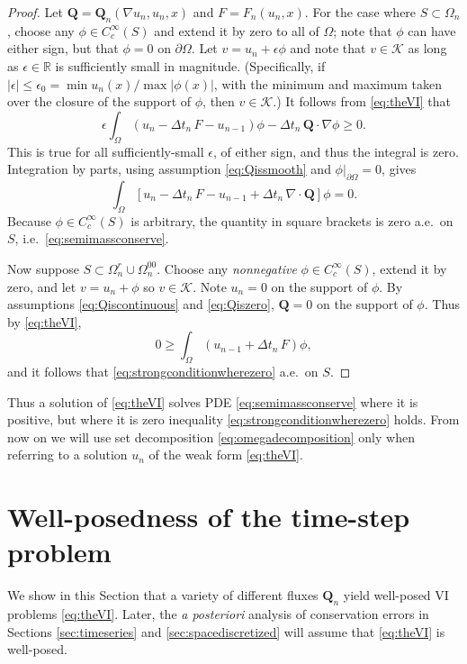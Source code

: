 \documentclass[final,onefignum]{siamart190516}
\newcommand\bQ{\mathbf{Q}}
\newcommand{\Div}{\nabla\cdot}
\newcommand\eps{\epsilon}
\newcommand{\grad}{\nabla}
\newcommand\RR{\mathbb{R}}
\begin{document}
\begin{proof}  Let $\bQ = \bQ_n(\grad u_n,u_n,x)$ and $F=F_n(u_n,x)$.  For the case where $S \subset \Omega_n$, choose any $\phi\in C_c^\infty(S)$ and extend it by zero to all of $\Omega$; note that $\phi$ can have either sign, but that $\phi=0$ on $\partial\Omega$.  Let $v = u_n + \eps \phi$ and note that $v \in \mathcal{K}$ as long as $\eps\in\RR$ is sufficiently small in magnitude.  (Specifically, if $|\eps|\le \eps_0 = \min u_n(x) / \max |\phi(x)|$, with the minimum and maximum taken over the closure of the support of $\phi$, then $v \in \mathcal{K}$.)  It follows from \eqref{eq:theVI} that
   $$\eps \int_\Omega \left(u_n - \Delta t_n\,F - u_{n-1}\right)\phi - \Delta t_n\,\bQ \cdot \grad \phi \ge 0.$$
This is true for all sufficiently-small $\eps$, of either sign, and thus the integral is zero.  Integration by parts, using assumption \eqref{eq:Qissmooth} and $\phi\big|_{\partial\Omega}=0$, gives
   $$\int_\Omega \left[ u_n - \Delta t_n\,F - u_{n-1} + \Delta t_n\,\Div\bQ \right]\phi = 0.$$
Because $\phi\in C_c^\infty(S)$ is arbitrary, the quantity in square brackets is zero a.e.~on $S$, i.e.~\eqref{eq:semimassconserve}.

Now suppose $S \subset \Omega_n^r \cup \Omega_n^{00}$.  Choose any \emph{nonnegative} $\phi\in C_c^\infty(S)$, extend it by zero, and let $v = u_n + \phi$ so $v\in\mathcal{K}$.  Note $u_n=0$ on the support of $\phi$.  By assumptions \eqref{eq:Qiscontinuous} and \eqref{eq:Qiszero}, $\bQ=0$ on the support of $\phi$.  Thus by \eqref{eq:theVI},
    $$0 \ge \int_{\Omega} \left(u_{n-1} + \Delta t_n\, F\right) \phi,$$
and it follows that \eqref{eq:strongconditionwherezero} a.e.~on $S$. \end{proof}

Thus a solution of \eqref{eq:theVI} solves PDE \eqref{eq:semimassconserve} where it is positive, but where it is zero inequality \eqref{eq:strongconditionwherezero} holds.  From now on we will use set decomposition \eqref{eq:omegadecomposition} only when referring to a solution $u_n$ of the weak form \eqref{eq:theVI}.


\section{Well-posedness of the time-step problem} \label{sec:wellposed}

We show in this Section that a variety of different fluxes $\bQ_n$ yield well-posed VI problems \eqref{eq:theVI}.  Later, the \emph{a posteriori} analysis of conservation errors in Sections \ref{sec:timeseries} and \ref{sec:spacediscretized} will assume that \eqref{eq:theVI} is well-posed.
\end{document}
